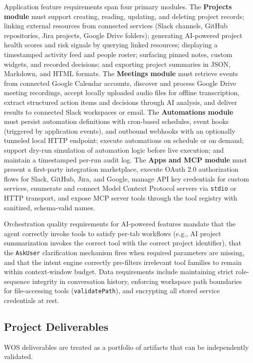 \documentclass[conference]{IEEEtran}
\begin{document}
Application feature requirements span four primary modules. The \textbf{Projects module} must support creating, reading, updating, and deleting project records; linking external resources from connected services (Slack channels, GitHub repositories, Jira projects, Google Drive folders); generating AI-powered project health scores and risk signals by querying linked resources; displaying a timestamped activity feed and people roster; surfacing pinned notes, custom widgets, and recorded decisions; and exporting project summaries in JSON, Markdown, and HTML formats. The \textbf{Meetings module} must retrieve events from connected Google Calendar accounts, discover and process Google Drive meeting recordings, accept locally uploaded audio files for offline transcription, extract structured action items and decisions through AI analysis, and deliver results to connected Slack workspaces or email. The \textbf{Automations module} must persist automation definitions with cron-based schedules, event hooks (triggered by application events), and outbound webhooks with an optionally tunneled local HTTP endpoint; execute automations on schedule or on demand; support dry-run simulation of automation logic before live execution; and maintain a timestamped per-run audit log. The \textbf{Apps and MCP module} must present a first-party integration marketplace, execute OAuth 2.0 authorization flows for Slack, GitHub, Jira, and Google, manage API key credentials for custom services, enumerate and connect Model Context Protocol servers via \texttt{stdio} or HTTP transport, and expose MCP server tools through the tool registry with sanitized, schema-valid names.

Orchestration quality requirements for AI-powered features mandate that the agent correctly invoke tools to satisfy per-tab workflows (e.g., AI project summarization invokes the correct tool with the correct project identifier), that the \texttt{AskUser} clarification mechanism fires when required parameters are missing, and that the intent engine correctly pre-filters irrelevant tool families to remain within context-window budget. Data requirements include maintaining strict role-sequence integrity in conversation history, enforcing workspace path boundaries for file-accessing tools (\texttt{validatePath}), and encrypting all stored service credentials at rest.

\subsection{Project Deliverables}
WOS deliverables are treated as a portfolio of artifacts that can be independently validated.
\end{document}
